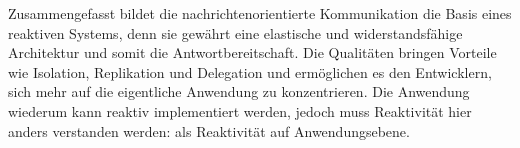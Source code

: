 Zusammengefasst bildet die nachrichtenorientierte Kommunikation die Basis eines reaktiven Systems, denn sie gewährt eine elastische und widerstandsfähige Architektur und somit die Antwortbereitschaft. Die Qualitäten bringen Vorteile wie Isolation, Replikation und Delegation und ermöglichen es den Entwicklern, sich mehr auf die eigentliche Anwendung zu konzentrieren. Die Anwendung wiederum kann reaktiv implementiert werden, jedoch muss Reaktivität hier anders verstanden werden: als Reaktivität auf Anwendungsebene.